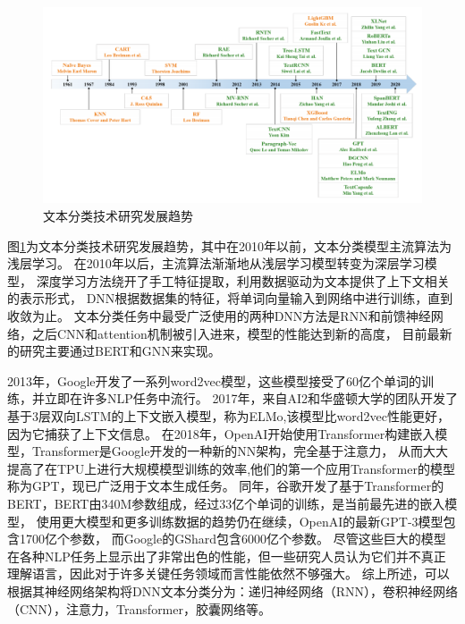 \begin{figure}[htbp]
  \centering
  \includegraphics[width=16cm]{./images/text.png}
  \caption{文本分类技术研究发展趋势\cite{li2020survey}}
  \label{fig:textClassification}
\end{figure}

图\ref{fig:textClassification}为文本分类技术研究发展趋势，其中在2010年以前，文本分类模型主流算法为浅层学习。
在2010年以后，主流算法渐渐地从浅层学习模型转变为深层学习模型，
深度学习方法绕开了手工特征提取，利用数据驱动为文本提供了上下文相关的表示形式，
DNN根据数据集的特征，将单词向量输入到网络中进行训练，直到收敛为止。
文本分类任务中最受广泛使用的两种DNN方法是RNN和前馈神经网络，之后CNN和attention机制被引入进来，模型的性能达到新的高度，
目前最新的研究主要通过BERT和GNN来实现。


2013年，Google开发了一系列word2vec模型\cite{mikolov2013distributed}，这些模型接受了60亿个单词的训练，并立即在许多NLP任务中流行。 
2017年，来自AI2和华盛顿大学的团队开发了基于3层双向LSTM的上下文嵌入模型，称为ELMo\cite{peters2018deep},该模型比word2vec性能更好，因为它捕获了上下文信息。
在2018年，OpenAI开始使用Transformer\cite{vaswani2017attention}构建嵌入模型，Transformer是Google开发的一种新的NN架构，完全基于注意力，
从而大大提高了在TPU上进行大规模模型训练的效率,他们的第一个应用Transformer的模型称为GPT\cite{radford2018improving}，现已广泛用于文本生成任务。
同年，谷歌开发了基于Transformer的BERT\cite{devlin2018bert}，BERT由340M参数组成，经过33亿个单词的训练，是当前最先进的嵌入模型，
使用更大模型和更多训练数据的趋势仍在继续，OpenAI的最新GPT-3模型\cite{brown2020language}包含1700亿个参数，
而Google的GShard\cite{lepikhin2020gshard}包含6000亿个参数。
尽管这些巨大的模型在各种NLP任务上显示出了非常出色的性能，但一些研究人员认为它们并不真正理解语言，因此对于许多关键任务领域而言性能依然不够强大。
综上所述，可以根据其神经网络架构将DNN文本分类分为：递归神经网络（RNN），卷积神经网络（CNN），注意力，Transformer，胶囊网络等。


